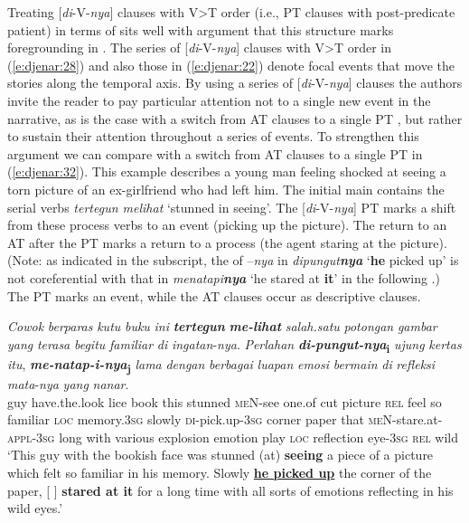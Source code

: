 \documentclass[output=paper
,modfonts
,nonflat]{langsci/langscibook}
\begin{document}
\noindent
Treating [\textit{di}-V-\textit{nya}] clauses with V>T order (i.e., PT clauses with post-predicate patient) in terms of  sits well with  argument that this structure marks foregrounding in . The series of [\textit{di}-V-\textit{nya}] clauses with V>T order in (\ref{e:djenar:28}) and also those in (\ref{e:djenar:22}) denote focal events that move the stories along the temporal axis. By using a series of [\textit{di}-V-\textit{nya}] clauses the authors invite the reader to pay particular attention not to a single new event in the narrative, as is the case with a switch from AT clauses to a single PT , but rather to sustain their attention throughout a series of events. To strengthen this argument we can compare with a switch from AT clauses to a single PT  in (\ref{e:djenar:32}). This example describes a young man feeling shocked at seeing a torn picture of an ex-girlfriend who had left him. The initial main  contains the serial verbs \textit{tertegun melihat} ‘stunned in seeing’. The [\textit{di}-V-\textit{nya}] PT  marks a shift from these process verbs to an event (picking up the picture). The return to an AT  after the PT  marks a return to a process (the agent staring at the picture). (Note: as indicated in the subscript, the  of –\textit{nya} in \textit{dipungut}\textbf{\textit{nya}} ‘\textbf{he} picked up’ is not coreferential with that in \textit{menatapi}\textbf{\textit{nya}} ‘he stared at \textbf{it}’ in the following .) The PT  marks an event, while the AT clauses occur as descriptive clauses.

\begin{exe}
	\ex\label{e:djenar:32}
	\gll \textit{Cowok} \textit{berparas} \textit{kutu} \textit{buku} \textit{ini} \textbf{\textit{tertegun}} \textbf{\textit{me-lihat}} \textit{salah.satu} \textit{potongan} \textit{gambar} \textit{yang} \textit{terasa} \textit{begitu} \textit{familiar} \textit{di} \textit{ingatan}-\textit{nya}. \textit{Perlahan} \textbf{\textit{di-pungut-nya}}\textbf{\textsubscript{i}} \textit{ujung} \textit{kertas} \textit{itu}, \textbf{\textit{me-natap-i-nya}}\textbf{\textsubscript{j}} \textit{lama} \textit{dengan} \textit{berbagai}  \textit{luapan} \textit{emosi} \textit{bermain} \textit{di} \textit{refleksi} \textit{mata}-\textit{nya} \textit{yang} \textit{nanar}.\\
	guy have.the.look lice book this stunned \textsc{meN}-see one.of cut picture \textsc{rel} feel so familiar \textsc{loc} memory.3\textsc{sg} slowly \textsc{di}-pick.up-\textsc{3sg} corner paper that \textsc{meN}-stare.at-\textsc{appl}-\textsc{3sg} long with various explosion emotion play \textsc{loc} reflection eye-\textsc{3sg} \textsc{rel} wild\\
	\glt ‘This guy with the bookish face was stunned (at) \textbf{seeing} a piece of a picture which felt so familiar in his memory. Slowly \uline{\textbf{he picked up}} the corner of the paper, [ ] \textbf{stared at it} for a long time with all sorts of emotions reflecting in his wild eyes.’ \hfill \citep[9]{Karina2008}
\end{exe}
\end{document}
